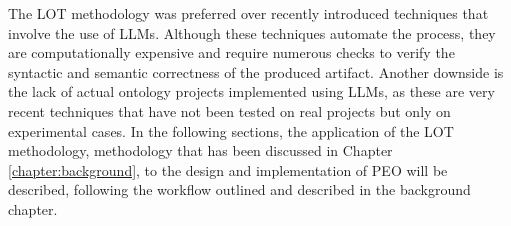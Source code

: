 The LOT methodology was preferred over recently introduced techniques that involve the use of LLMs.
Although these techniques automate the process, they are computationally expensive and require numerous checks to verify the syntactic and semantic correctness of the produced artifact.
Another downside is the lack of actual ontology projects implemented using LLMs, as these are very recent techniques that have not been tested on real projects but only on experimental cases.
In the following sections, the application of the LOT methodology, methodology that has been discussed in Chapter \ref{chapter:background}, to the design and implementation of PEO will be described, following the workflow outlined and described in the background chapter.

